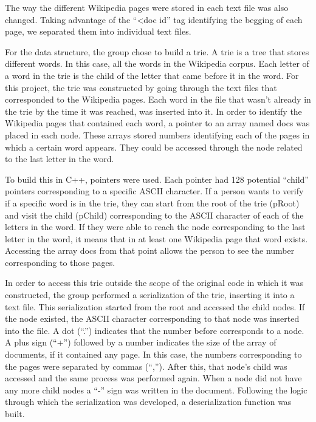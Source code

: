 \documentclass{article}
\begin{document}
The way the different Wikipedia pages were stored in each text file was also changed. Taking advantage of the ``<doc id'' tag identifying the begging of each page, we separated them into individual text files. 

For the data structure, the group chose to build a trie. A trie is a tree that stores different words. In this case, all the words in the Wikipedia corpus. Each letter of a word in the trie is the child of the letter that came before it in the word. 
For this project, the trie was constructed by going through the text files that corresponded to the Wikipedia pages. Each word in the file that wasn't already in the trie by the time it was reached, was inserted into it. In order to identify the Wikipedia pages that contained each word, a pointer to an array named docs was placed in each node. These arrays stored numbers identifying each of the pages in which a certain word appears. They could be accessed through the node related to the last letter in the word. 

To build this in C++, pointers were used. Each pointer had 128 potential ``child'' pointers corresponding to a specific ASCII character. If a person wants to verify if a specific word is in the trie, they can start from the root of the trie (pRoot) and visit the child (pChild) corresponding to the ASCII character of each of the letters in the word. If they were able to reach the node corresponding to the last letter in the word, it means that in at least one Wikipedia page that word exists. Accessing the array docs from that point allows the person to see the number corresponding to those pages.


In order to access this trie outside the scope of the original code in which it was constructed, the group performed a serialization of the trie, inserting it into a text file. This serialization started from the root and accessed the child nodes. If the node existed, the ASCII character corresponding to that node was inserted into the file. A dot (``.'') indicates that the number before corresponds to a node. A plus sign (``+'') followed by a number indicates the size of the array of documents, if it contained any page. In this case, the numbers corresponding to the pages were separated by commas (``,''). After this, that node's child was accessed and the same process was performed again. When a node did not have any more child nodes a ``-'' sign was written in the document. Following the logic through which the serialization was developed, a deserialization function was built. 
\end{document}
